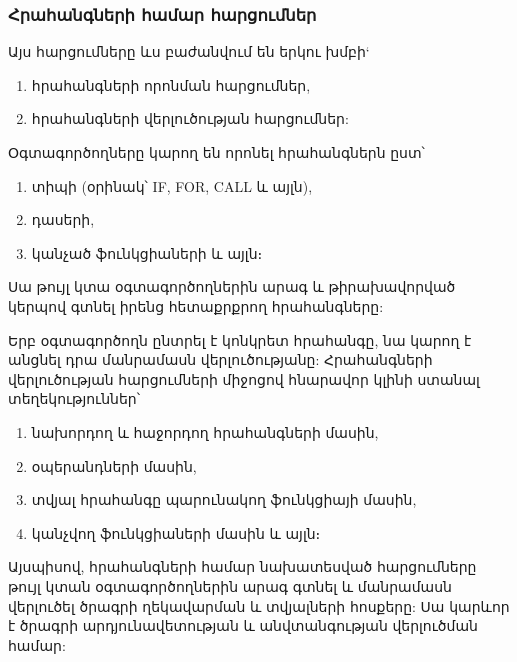 \subsubsection*{Հրահանգների համար հարցումներ}\label{subsubsec:instructions}

Այս հարցումները ևս բաժանվում են երկու խմբի`
\begin{enumerate}
    \item հրահանգների որոնման հարցումներ,
    \item հրահանգների վերլուծության հարցումներ:
\end{enumerate}

Օգտագործողները կարող են որոնել հրահանգներն ըստ՝
\begin{enumerate}
    \item տիպի (օրինակ՝ IF, FOR, CALL և այլն),
    \item դասերի,
    \item կանչած ֆունկցիաների և այլն։
\end{enumerate}

Սա թույլ կտա օգտագործողներին արագ և թիրախավորված կերպով գտնել իրենց հետաքրքրող հրահանգները:

Երբ օգտագործողն ընտրել է կոնկրետ հրահանգը, նա կարող է անցնել դրա մանրամասն վերլուծությանը:  Հրահանգների վերլուծության հարցումների
միջոցով հնարավոր կլինի ստանալ տեղեկություններ՝
\begin{enumerate}
    \item նախորդող և հաջորդող հրահանգների մասին,
    \item օպերանդների մասին,
    \item տվյալ հրահանգը պարունակող ֆունկցիայի մասին,
    \item կանչվող ֆունկցիաների մասին և այլն։
\end{enumerate}

Այսպիսով, հրահանգների համար նախատեսված հարցումները թույլ կտան օգտագործողներին արագ գտնել և մանրամասն վերլուծել
ծրագրի ղեկավարման և տվյալների հոսքերը: Սա կարևոր է ծրագրի արդյունավետության և անվտանգության վերլուծման համար:
